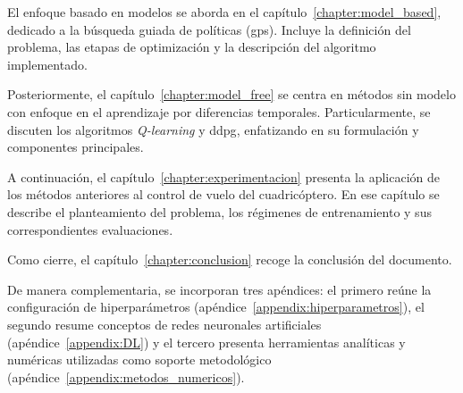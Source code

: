 El enfoque basado en modelos se aborda en el capítulo~\ref{chapter:model_based}, dedicado a la búsqueda guiada de políticas (\acrshort{gps}). Incluye la definición del problema, las etapas de optimización y la descripción del algoritmo implementado.

Posteriormente, el capítulo~\ref{chapter:model_free} se centra en métodos sin modelo con enfoque en el aprendizaje por diferencias temporales. Particularmente, se discuten los algoritmos \textit{Q-learning} y \acrshort{ddpg}, enfatizando en su formulación y componentes principales.

A continuación, el capítulo~\ref{chapter:experimentacion} presenta la aplicación de los métodos anteriores al control de vuelo del cuadricóptero. En ese capítulo se describe el planteamiento del problema, los régimenes de entrenamiento y sus correspondientes evaluaciones.

Como cierre, el capítulo~\ref{chapter:conclusion} recoge la conclusión del documento.

De manera complementaria, se incorporan tres apéndices: el primero reúne la configuración de hiperparámetros (apéndice~\ref{appendix:hiperparametros}), el segundo resume conceptos de redes neuronales artificiales (apéndice~\ref{appendix:DL}) y el tercero presenta herramientas analíticas y numéricas utilizadas como soporte metodológico (apéndice~\ref{appendix:metodos_numericos}).
